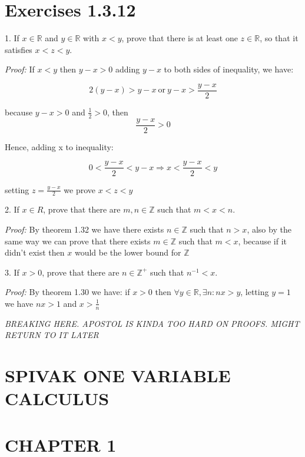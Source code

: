 \documentclass[a4paper, 11pt]{article}
\begin{document}
\section*{Exercises 1.3.12}

\hrulefill

1. If $x \in \mathbb{R}$ and $y \in \mathbb{R}$ with $x < y$, prove that there is at least one $z \in \mathbb{R}$, so that it satisfies $x < z < y$.

\emph{Proof:} If $x < y$ then $y - x > 0$ adding $y - x$ to both sides of inequality, we have:

$$2(y - x) > y - x \ \textrm{or} \ y - x > \frac{y - x}{2}$$

because $y - x > 0$ and $\frac{1}{2} > 0$, then 
$$\frac{y - x}{2} > 0$$

Hence, adding x to inequality:

$$0 < \frac{y - x}{2} < y - x \Rightarrow x < \frac{y - x}{2} < y$$

setting $z = \frac{y - x}{2}$ we prove $x < z < y$

\hrulefill

2. If $x \in R$, prove that there are $m, n \in \mathbb{Z}$ such that $m < x < n$.

\emph{Proof:} By theorem 1.32 we have there exists $n \in \mathbb{Z}$ such that
$n > x$, also by the same way we can prove that there exists $m \in \mathbb{Z}$
such that $m < x$, because if it didn't exist then $x$ would be the lower bound
for $\mathbb{Z}$

\hrulefill

3. If $x > 0$, prove that there are $n \in \mathbb{Z}^+$ such that $n^{-1} < x$.

\emph{Proof:} By theorem 1.30 we have: if $x > 0$ then $\forall y \in \mathbb{R}, \exists n : nx > y$,
letting $y = 1$ we have $nx > 1$ and $x > \frac{1}{n}$

\hrulefill

\emph{BREAKING HERE. APOSTOL IS KINDA TOO HARD ON PROOFS. MIGHT RETURN TO IT LATER}

\section*{SPIVAK ONE VARIABLE CALCULUS}
\section*{CHAPTER 1}
\end{document}
